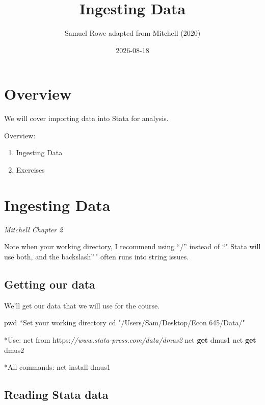\documentclass[
]{book}
\title{Ingesting Data}
\author{Samuel Rowe adapted from Mitchell (2020)}
\date{2026-08-18}
\newenvironment{Shaded}{\begin{snugshade}}{\end{snugshade}}
\newcommand{\CommentTok}[1]{\textcolor[rgb]{0.56,0.35,0.01}{\textit{#1}}}
\newcommand{\FunctionTok}[1]{\textcolor[rgb]{0.13,0.29,0.53}{\textbf{#1}}}
\newcommand{\NormalTok}[1]{#1}
\newcommand{\StringTok}[1]{\textcolor[rgb]{0.31,0.60,0.02}{#1}}
\providecommand{\tightlist}{%
  \setlength{\itemsep}{0pt}\setlength{\parskip}{0pt}}
\begin{document}
\maketitle

{
\setcounter{tocdepth}{1}
\tableofcontents
}
\chapter*{Overview}\label{overview}

We will cover importing data into Stata for analysis.

Overview:

\begin{enumerate}
\def\labelenumi{\arabic{enumi}.}
\tightlist
\item
  Ingesting Data
\item
  Exercises
\end{enumerate}

\chapter{Ingesting Data}\label{ingesting-data}

\emph{Mitchell Chapter 2}

Note when your working directory, I recommend using ``/'' instead of ``"
Stata will use both, and the backslash''\," often runs into string issues.

\section{Getting our data}\label{getting-our-data}

We'll get our data that we will use for the course.

\begin{Shaded}
\begin{Highlighting}[]
\NormalTok{pwd}
\NormalTok{*Set your working directory}
\NormalTok{cd }\StringTok{"/Users/Sam/Desktop/Econ 645/Data/"}

\NormalTok{*Use:}
\NormalTok{net from https:}\CommentTok{//www.stata{-}press.com/data/dmus2}
\NormalTok{net }\FunctionTok{get}\NormalTok{ dmus1}
\NormalTok{net }\FunctionTok{get}\NormalTok{ dmus2}

\NormalTok{*All commands:}
\NormalTok{net install dmus1}
\end{Highlighting}
\end{Shaded}

\section{Reading Stata data}\label{reading-stata-data}
\end{document}
